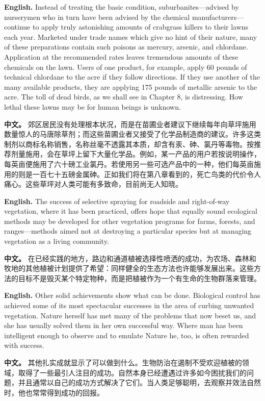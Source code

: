 \noindent\textbf{English.} Instead of treating the basic condition, suburbanites---advised by nurserymen who in turn have been advised by the chemical manufacturers---continue to apply truly astonishing amounts of crabgrass killers to their lawns each year. Marketed under trade names which give no hint of their nature, many of these preparations contain such poisons as mercury, arsenic, and chlordane. Application at the recommended rates leaves tremendous amounts of these chemicals on the lawn. Users of one product, for example, apply 60 pounds of technical chlordane to the acre if they follow directions. If they use another of the many available products, they are applying 175 pounds of metallic arsenic to the acre. The toll of dead birds, as we shall see in Chapter 8, is distressing. How lethal these lawns may be for human beings is unknown.
\par
\noindent\textbf{中文。} 郊区居民没有处理根本状况，而是在苗圃业者建议下继续每年向草坪施用数量惊人的马唐除草剂；而这些苗圃业者又接受了化学品制造商的建议。许多这类制剂以商标名称销售，名称丝毫不透露其本质，却含有汞、砷、氯丹等毒物。按推荐剂量施用，会在草坪上留下大量化学品。例如，某一产品的用户若按说明操作，每英亩便施用了六十磅工业氯丹。若使用另一些可选产品中的一种，他们每英亩施用的则是一百七十五磅金属砷。正如我们将在第八章看到的，死亡鸟类的代价令人痛心。这些草坪对人类可能有多致命，目前尚无人知晓。
\par\medskip

\noindent\textbf{English.} The success of selective spraying for roadside and right-of-way vegetation, where it has been practiced, offers hope that equally sound ecological methods may be developed for other vegetation programs for farms, forests, and ranges---methods aimed not at destroying a particular species but at managing vegetation as a living community.
\par
\noindent\textbf{中文。} 在已经实践的地方，路边和通道植被选择性喷洒的成功，为农场、森林和牧地的其他植被计划提供了希望：同样健全的生态方法也许能够发展出来。这些方法的目标不是毁灭某个特定物种，而是把植被作为一个有生命的生物群落来管理。
\par\medskip

\noindent\textbf{English.} Other solid achievements show what can be done. Biological control has achieved some of its most spectacular successes in the area of curbing unwanted vegetation. Nature herself has met many of the problems that now beset us, and she has usually solved them in her own successful way. Where man has been intelligent enough to observe and to emulate Nature he, too, is often rewarded with success.
\par
\noindent\textbf{中文。} 其他扎实成就显示了可以做到什么。生物防治在遏制不受欢迎植被的领域，取得了一些最引人注目的成功。自然本身已经遭遇过许多如今困扰我们的问题，并且通常以自己的成功方式解决了它们。当人类足够聪明，去观察并效法自然时，他也常常得到成功的回报。
\par\medskip


